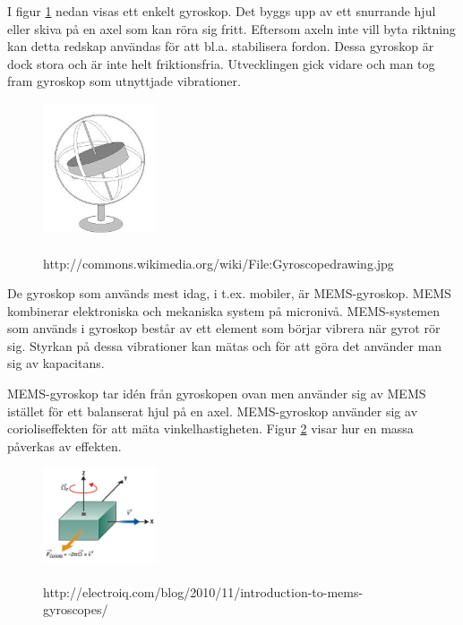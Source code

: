\documentclass[a4paper,12pt,fleqn]{article}
\begin{document}
I figur \ref{fig:gyro} nedan visas ett enkelt gyroskop. Det byggs upp av ett snurrande hjul eller skiva på en axel som kan röra sig fritt. Eftersom axeln inte vill byta riktning kan detta redskap användas för att bl.a. stabilisera fordon. Dessa gyroskop är dock stora och är inte helt friktionsfria. Utvecklingen gick vidare och man tog fram gyroskop som utnyttjade vibrationer.

\begin{figure}[h]
\begin{center}
\includegraphics[width=0.3\textwidth]
{gyro.jpeg}
\caption{\\http://commons.wikimedia.org/wiki/File:Gyroscopedrawing.jpg}
\label{fig:gyro}
\end{center}
\end{figure}


De gyroskop som används mest idag, i t.ex. mobiler, är MEMS-gyroskop. MEMS kombinerar elektroniska och mekaniska system på micronivå. MEMS-systemen som används i gyroskop består av ett element som börjar vibrera när gyrot rör sig. Styrkan på dessa vibrationer kan mätas och för att göra det använder man sig av kapacitans.

MEMS-gyroskop tar idén från gyroskopen ovan men använder sig av MEMS istället för ett balanserat hjul på en axel. MEMS-gyroskop använder sig av corioliseffekten för att mäta vinkelhastigheten. Figur \ref{fig:coriolis} visar hur en massa påverkas av effekten.

\begin{figure}[h]
\begin{center}
\caption{\\http://electroiq.com/blog/2010/11/introduction-to-mems-gyroscopes/}
\label{fig:coriolis}
\includegraphics[width=0.3\textwidth]
{coriolis.png}
\end{center}
\end{figure}
\end{document}
